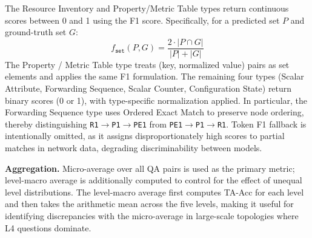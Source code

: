 The Resource Inventory and Property/Metric Table types return continuous scores between 0 and 1 using the F1 score.
Specifically, for a predicted set $P$ and ground-truth set $G$:
\begin{equation}
  f_{\texttt{set}}(P, G) = \frac{2 \cdot |P \cap G|}{|P| + |G|}
  \label{eq:set-f1}
\end{equation}
The Property / Metric Table type treats (key, normalized value) pairs as set elements and applies the same F1 formulation.
The remaining four types (Scalar Attribute, Forwarding Sequence, Scalar Counter, Configuration State) return binary scores (0 or 1), with type-specific normalization applied. In particular, the Forwarding Sequence type uses Ordered Exact Match to preserve node ordering, thereby distinguishing \texttt{R1$\rightarrow$P1$\rightarrow$PE1} from \texttt{PE1$\rightarrow$P1$\rightarrow$R1}.
Token F1 fallback is intentionally omitted, as it assigns disproportionately high scores to partial matches in network data, degrading discriminability between models.

\textbf{Aggregation.}
Micro-average over all QA pairs is used as the primary metric; level-macro average is additionally computed to control for the effect of unequal level distributions.
The level-macro average first computes TA-Acc for each level and then takes the arithmetic mean across the five levels, making it useful for identifying discrepancies with the micro-average in large-scale topologies where L4 questions dominate.



